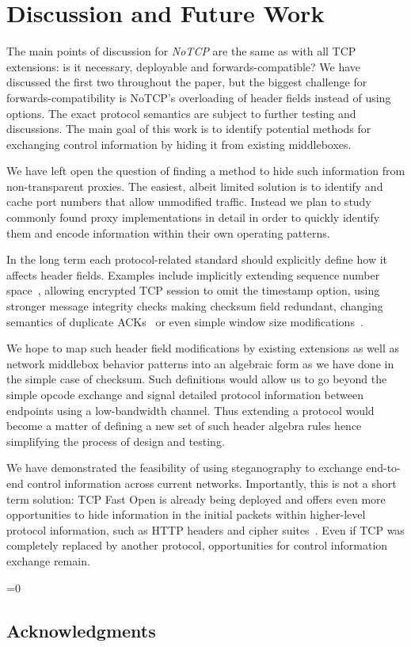 \documentclass{sig-alternate-10pt}
\def\anon{1}        %
\begin{document}
\section{Discussion and Future Work}

The main points of discussion for \emph{NoTCP} are the same as with all TCP extensions: is it necessary, deployable and forwards-compatible? We have discussed the first two throughout the paper, but the biggest challenge for forwards-compatibility is NoTCP's overloading of header fields instead of using options. The exact protocol semantics are subject to further testing and discussions. The main goal of this work is to identify potential methods for exchanging control information by hiding it from existing middleboxes.

We have left open the question of finding a method to hide such information from non-transparent proxies. The easiest, albeit limited solution is to identify and cache port numbers that allow unmodified traffic. Instead we plan to study commonly found proxy implementations in detail in order to quickly identify them and encode information within their own operating patterns.

In the long term each protocol-related standard should explicitly define how it affects header fields. Examples include implicitly extending sequence number space~\cite{Mazieres:uz}, allowing encrypted TCP session to omit the timestamp option, using stronger message integrity checks making checksum field redundant, changing semantics of duplicate ACKs~\cite{Handley:vj,Flach:2013uy} or even simple window size modifications~\cite{Crowcroft:1998dk}.

We hope to map such header field modifications by existing extensions as well as network middlebox behavior patterns into an algebraic form as we have done in the simple case of checksum. Such definitions would allow us to go beyond the simple opcode exchange and signal detailed protocol information between endpoints using a low-bandwidth channel. Thus extending a protocol would become a matter of defining a new set of such header algebra rules hence simplifying the process of design and testing.

We have demonstrated the feasibility of using steganography to exchange end-to-end control information across current networks. Importantly, this is not a short term solution: TCP Fast Open is already being deployed and offers even more opportunities to hide information in the initial packets within higher-level protocol information, such as HTTP headers and cipher suites~\cite{Zielinska:2014fn}. Even if TCP was completely replaced by another protocol, opportunities for control information exchange remain.

\ifnum\anon=0
\subsection*{Acknowledgments}

\fi


\clearpage
{


\small 

}

%
\end{document}
